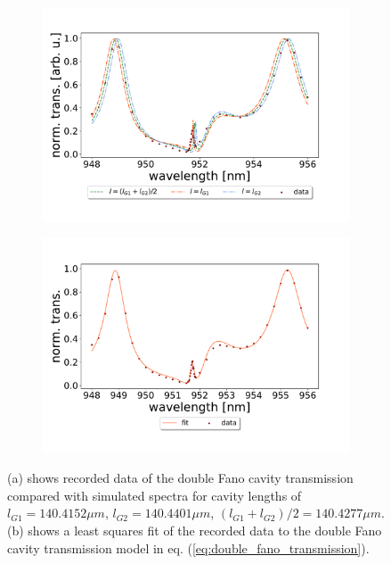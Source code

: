 \begin{figure}[h!]
    \centering
    \begin{subfigure}[b]{0.49\textwidth}
        \centering
        \includegraphics[width=\textwidth]{figures/results/129um_long_scan_sim_comparison.pdf}
        \caption{}
        \label{fig:129um_long_scan_sim_comparison}
    \end{subfigure}
    \begin{subfigure}[b]{0.49\textwidth}
        \centering
        \includegraphics[width=\textwidth]{figures/results/129um_long_scan_fit2.pdf}
        \caption{}
        \label{fig:129um_long_scan_fit}
    \end{subfigure}
    \caption{(a) shows recorded data of the double Fano cavity transmission compared with simulated spectra for cavity lengths of $l_{G1} = 140.4152 \mu m$, $l_{G2} = 140.4401 \mu m$, $(l_{G1} + l_{G2})/2 = 140.4277 \mu m$. (b) shows a least squares fit of the recorded data to the double Fano cavity transmission model in eq. (\ref{eq:double_fano_transmission}).}
    \label{fig:129um_cavity_fit_and_sim}
\end{figure}

